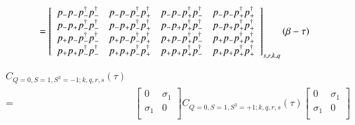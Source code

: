 \begin{equation*}
  \begin{aligned}    
    &= \left[ 
    {\begin{array}{cccc}
      p_{-}p_{-}p^\dagger_{-}p^\dagger_{-} & p_{-}p_{-}p^\dagger_{-}p^\dagger_{+} & p_{-}p_{-}p^\dagger_{+}p^\dagger_{-} & p_{-}p_{-}p^\dagger_{+}p^\dagger_{+} \\
      p_{-}p_{+}p^\dagger_{-}p^\dagger_{-} & p_{-}p_{+}p^\dagger_{-}p^\dagger_{+} & p_{-}p_{+}p^\dagger_{+}p^\dagger_{-} & p_{-}p_{+}p^\dagger_{+}p^\dagger_{+} \\
      p_{+}p_{-}p^\dagger_{-}p^\dagger_{-} & p_{+}p_{-}p^\dagger_{-}p^\dagger_{+} & p_{+}p_{-}p^\dagger_{+}p^\dagger_{-} & p_{+}p_{-}p^\dagger_{+}p^\dagger_{+} \\
      p_{+}p_{+}p^\dagger_{-}p^\dagger_{-} & p_{+}p_{+}p^\dagger_{-}p^\dagger_{+} & p_{+}p_{+}p^\dagger_{+}p^\dagger_{-} & p_{+}p_{+}p^\dagger_{+}p^\dagger_{+} \\
    \end{array} } \right]_{s,r,k,q} (\beta-\tau)
  \end{aligned}
\end{equation*}

\begin{equation*}
  \begin{aligned}
    C_{Q=0,S=1,S^3=-1;k,q,r,s} (\tau) \\
    =& \left[ {\begin{array}{cc}
      0 & \sigma_1 \\
      \sigma_1 & 0 \\
    \end{array} } \right]
    C_{Q=0,S=1,S^3=+1;k,q,r,s} (\tau)
    \left[ {\begin{array}{cc}
      0 & \sigma_1 \\
      \sigma_1 & 0 \\
    \end{array} } \right]
  \end{aligned}
\end{equation*}

